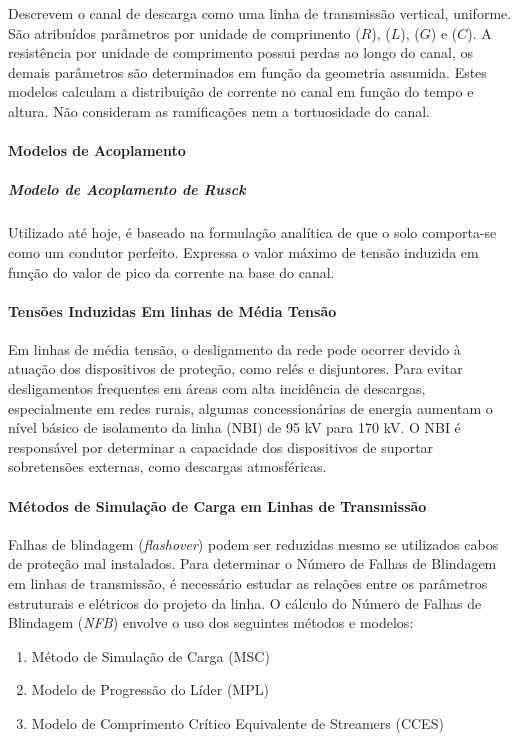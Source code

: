 \documentclass[a4paper, 12pt, onecolumn,singlespacing]{article}
\begin{document}
		Descrevem o canal de descarga como uma linha de transmissão vertical, uniforme. São atribuídos parâmetros por unidade de comprimento ($R$), ($L$), ($G$) e ($C$). A resistência por unidade de comprimento possui perdas ao longo do canal, os demais parâmetros são determinados em função da geometria assumida. Estes modelos calculam a distribuição de corrente no canal em função do tempo e altura. Não consideram as ramificações nem a tortuosidade do canal.
		
		\paragraph{Modelos de Acoplamento}
		
		\subparagraph{Modelo de Acoplamento de Rusck} Utilizado até hoje, é baseado na formulação analítica de que o solo comporta-se	como um condutor perfeito. Expressa o valor máximo de tensão induzida em função do valor de pico da corrente na base do canal.
		
		\paragraph{Tensões Induzidas Em linhas de Média Tensão}
		
		Em linhas de média tensão, o desligamento da rede pode ocorrer devido à atuação dos dispositivos de proteção, como relés e disjuntores. Para evitar desligamentos frequentes em áreas com alta incidência de descargas, especialmente em redes rurais, algumas concessionárias de energia aumentam o nível básico de isolamento da linha (NBI) de 95 kV para 170 kV. O NBI é responsável por determinar a capacidade dos dispositivos de suportar sobretensões externas, como descargas atmosféricas.
		
		\paragraph{Métodos de Simulação de Carga em Linhas de Transmissão}
		
		Falhas de blindagem (\textit{flashover}) podem ser reduzidas mesmo se utilizados cabos de proteção mal instalados. Para determinar o Número de Falhas de Blindagem em linhas de transmissão, é necessário estudar as relações entre os parâmetros estruturais e elétricos do projeto da linha. O cálculo do Número de Falhas de Blindagem (\textit{NFB}) envolve o uso dos seguintes métodos e modelos:
		
		\begin{enumerate}
			\item Método de Simulação de Carga (MSC)
			\item Modelo de Progressão do Líder (MPL)
			\item Modelo de Comprimento Crítico Equivalente de Streamers (CCES)
		\end{enumerate}
		
\end{document}
